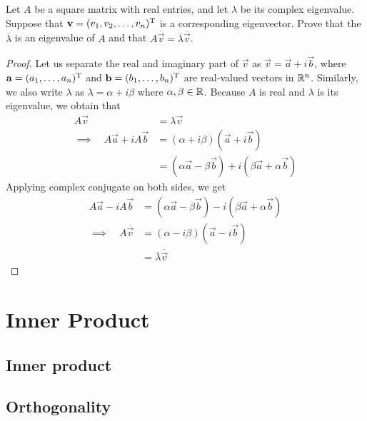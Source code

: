 \begin{exercise}
  Let $A$ be a square matrix with real entries, and let $\lambda$
  be its complex eigenvalue. Suppose that $\mathbf{v}=(v_1,v_2,\dots,v_n)^\mathrm{T}$
  is a corresponding eigenvector. Prove that the $\overline{\lambda}$ is an
  eigenvalue of $A$ and that 
  $A\overline{\vec{v}}=\overline{\lambda}\overline{\vec{v}}$.
\end{exercise}
\begin{proof}
  Let us separate the real and imaginary part of $\vec{v}$ as
  $\vec{v}=\vec{a}+i\vec{b}$, where 
  $\mathbf{a}=(a_1,\dots,a_n)^\mathrm{T}$ and $\mathbf{b}=(b_1,\dots,b_n)^\mathrm{T}$
  are real-valued vectors in $\R^n$. Similarly, we also write $\lambda$ as
  $\lambda=\alpha+i\beta$ where $\alpha,\beta\in\R$.
  Because $A$ is real and $\lambda$
  is its eigenvalue, we obtain that
  \begin{align*}
    A\vec{v}
      &=\lambda\vec{v}\\\implies\quad
    A\vec{a}+iA\vec{b}
      &=(\alpha+i\beta)(\vec{a}+i\vec{b})\\
      &=(\alpha\vec{a}-\beta\vec{b})+i(\beta\vec{a}+\alpha\vec{b})
  \end{align*}
  Applying complex conjugate on both sides, we get
  \begin{align*}
    A\vec{a}-iA\vec{b}
    &=(\alpha\vec{a}-\beta\vec{b})-i(\beta\vec{a}+\alpha\vec{b})\\
    \implies\quad A\overline{\vec{v}}
    &=(\alpha-i\beta)(\vec{a}-i\vec{b})\\
    &=\overline{\lambda}\overline{\vec{v}}
  \end{align*}
\end{proof}
\chapter{Inner Product}

\section{Inner product}
\section{Orthogonality}

